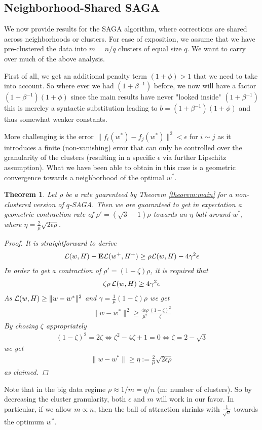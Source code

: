\documentclass{article}
\newtheorem{theorem}{Theorem}
\newcommand{\E}{{\bf E}}
\begin{document}
\subsection{Neighborhood-Shared SAGA}

We now provide results for the SAGA algorithm, where corrections are shared across neighborhoods or clusters. For ease of exposition, we assume that we have pre-clustered the data into $m = n/q$ clusters of equal size $q$. We want to carry over much of the above analysis. 

First of all, we get an additional penalty term $(1+\phi)>1$ that we need to take into account. So where ever we had $(1+\beta^{-1})$ before, we now will have a factor $(1+\beta^{-1})(1+\phi)$ since the main results have never "looked inside" $(1+\beta^{-1})$ this is mereley a syntactic substitution leading to $b = (1+\beta^{-1})(1+\phi)$ and thus somewhat weaker constants. 

More challenging is the error $\| f_i(w^*) - f_j(w^*) \|^2 < \epsilon$ for $i \sim j$ as it introduces a finite (non-vanishing) error that can only be controlled over the granularity of the clusters (resulting in a specific $\epsilon$ via further Lipschitz assumption). What we have been able to obtain in this case is a geometric convergence towards a neighborhood of the optimal $w^*$. 
\begin{theorem}
Let  $\rho$ be a rate guarenteed by Theorem \ref{theorem:main} for a non-clustered version of $q$-SAGA. Then we are guaranteed to get in expectation a geometric contraction rate of $\rho'= (\sqrt 3-1) \rho$ towards an $\eta$-ball around $w^*$, where $\eta = \frac{2}{\mu} \sqrt{2\epsilon \rho}$.
\begin{proof}
It is straightforward to derive 
\begin{align}
\L(w,H) - \E\L(w^+,H^+) \ge \rho \L(w,H) - 4 \gamma^2  \epsilon
\end{align}
In order to get a contraction of $\rho'=(1-\zeta)\rho$, it is required that 
\begin{align}
\zeta \rho \, {\mathcal L}(w,H) \ge 4 \gamma^2 \epsilon
\end{align}
As ${\mathcal L}(w,H) \geq \| w - w^*\|^2$ and $\gamma = \frac 1\mu (1-\zeta)\rho$ we get
\begin{align}
\|w -w^*\|^2 \ge \frac{4 \epsilon \rho}{ \mu^2} \frac {(1-\zeta)^2}{\zeta} 
\end{align}
By chosing $\zeta$ appropriately
\begin{align}
(1-\zeta)^2 = 2 \zeta \iff \zeta^2 - 4 \zeta + 1 =0 \iff \zeta = 2 - \sqrt{3}
\end{align}
we get 
\begin{align}
\| w - w^*\| \ge \eta := \frac 2 \mu \sqrt{2\epsilon \rho}
\end{align}
as claimed. 
\end{proof}
\end{theorem}
Note that in the big data regime $\rho \approx 1/m = q/n$ (m: number of clusters). So by decreasing the cluster granularity, both $\epsilon$ and $m$ will work in our favor. In particular, if we allow $m \propto n$, then the ball of attraction shrinks with $\frac 1 {\sqrt{n}}$ towards the optimum $w^*$.\\[10mm]
\end{document}
